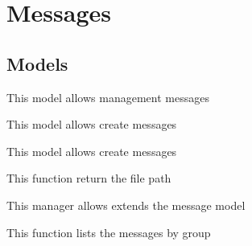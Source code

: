 \documentclass[letterpaper,10pt,english]{sphinxmanual}
\begin{document}
\section{Messages}
\label{modules/messages:messages}\label{modules/messages::doc}

\subsection{Models}
\label{modules/messages:models}
This model allows management messages
\label{modules/messages:module-apps.message.models}

\begin{fulllineitems}
\label{modules/messages:apps.message.models.Message}
This model allows create messages

\end{fulllineitems}


\begin{fulllineitems}
\label{modules/messages:apps.message.models.MessageGroup}
This model allows create messages

\begin{fulllineitems}
\label{modules/messages:apps.message.models.MessageGroup.filename}
This function return the file path

\end{fulllineitems}


\end{fulllineitems}


\begin{fulllineitems}
\label{modules/messages:apps.message.models.MessageGroupManager}
This manager allows extends the message model

\begin{fulllineitems}
\label{modules/messages:apps.message.models.MessageGroupManager.getMessages}
This function lists the messages by group

\end{fulllineitems}


\end{fulllineitems}
\end{document}
